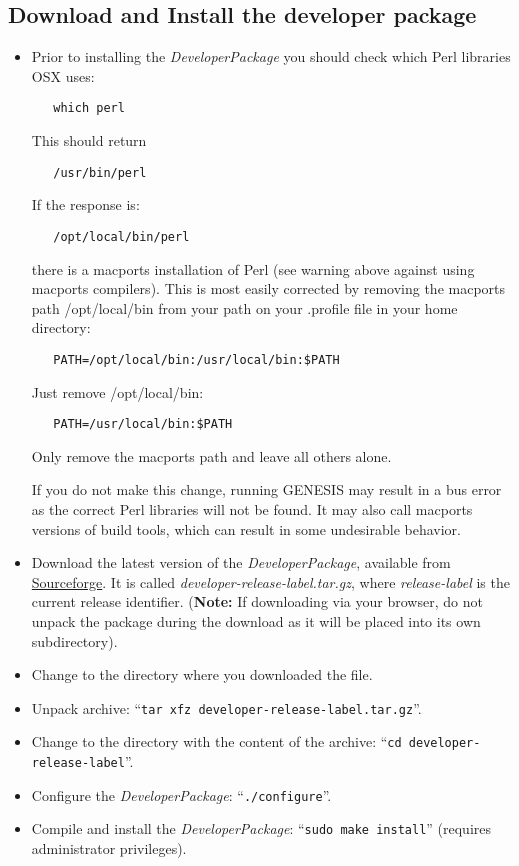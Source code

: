 \documentclass[12pt]{article}
\begin{document}
\subsection*{Download and Install the developer package}
\begin{itemize}
   \item[] Prior to installing the {\it DeveloperPackage} you should check which Perl libraries OSX uses:
   \begin{verbatim}
   which perl
   \end{verbatim}
   This should return
   \begin{verbatim}
   /usr/bin/perl
   \end{verbatim}
   If the response is:
   \begin{verbatim}
   /opt/local/bin/perl
   \end{verbatim}
  there is a macports installation of Perl (see warning above against using macports compilers). This is most easily corrected by removing the macports path /opt/local/bin from your path on your .profile file in your home directory:
   \begin{verbatim}
   PATH=/opt/local/bin:/usr/local/bin:$PATH
   \end{verbatim}

   Just remove /opt/local/bin:

   \begin{verbatim}
   PATH=/usr/local/bin:$PATH
   \end{verbatim}
   
   Only remove the macports path and leave all others alone.

   If you do not make this change, running GENESIS may result in a bus error as the correct Perl libraries will not be found. It may also call macports versions of build tools, which can result in some undesirable behavior.  
   \item[] Download the latest version of the {\it DeveloperPackage}, available from \href{http://sourceforge.net/projects/neurospaces/files/}{Sourceforge}.  It is called {\it developer-release-label.tar.gz}, where {\it release-label} is the current release identifier. ({\bf Note:} If downloading via your browser, do not unpack the package during the download as it will be placed into its own subdirectory).
   \item[] Change to the directory where you downloaded the file.
   \item[] Unpack archive: ``{\tt tar xfz developer-release-label.tar.gz}''.
   \item[] Change to the directory with the content of the archive: ``{\tt cd developer-release-label}''.
   \item[] Configure the {\it DeveloperPackage}: ``{\tt ./configure}''.
   \item[] Compile and install the {\it DeveloperPackage}: ``{\tt sudo make install}'' (requires administrator privileges).
\end{itemize}
\end{document}
